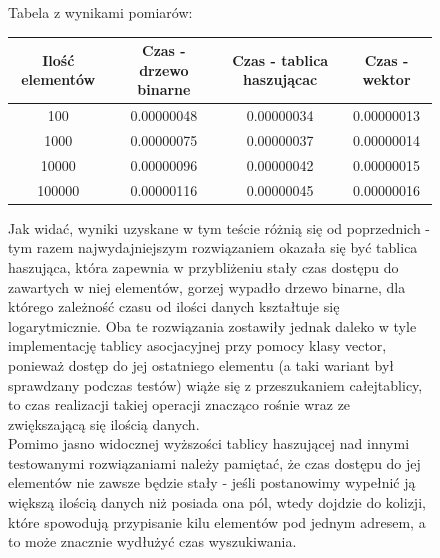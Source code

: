 \documentclass[a4paper,11pt]{report}
\begin{document}
\begin{figure}
 \begin{center}
  Tabela z wynikami pomiarów:\\
  \begin{tabular}{|c|c|c|c|}
  \hline 
  Ilość elementów & Czas - drzewo binarne & Czas - tablica haszującac & Czas - wektor\\
  \hline
  100 & 0.00000048 & 0.00000034 & 0.00000013\\
  \hline
  1000	&	0.00000075 & 0.00000037 & 0.00000014\\
  \hline
  10000	&	0.00000096 & 0.00000042 & 0.00000015 \\
  \hline
  100000 &	0.00000116 & 0.00000045 & 0.00000016\\
  \hline

\end{tabular} 
\end{center}
  Jak widać, wyniki uzyskane w tym teście różnią się od poprzednich - tym razem najwydajniejszym rozwiązaniem okazała się być tablica haszująca, która zapewnia w przybliżeniu stały czas dostępu do zawartych w niej elementów, gorzej wypadło drzewo binarne, dla którego zależność czasu od ilości danych kształtuje się logarytmicznie. Oba te rozwiązania zostawiły jednak daleko w tyle implementację tablicy asocjacyjnej przy pomocy klasy vector, ponieważ dostęp do jej ostatniego elementu (a taki wariant był sprawdzany podczas testów) wiąże się z przeszukaniem całejtablicy, to czas realizacji takiej operacji znacząco rośnie wraz ze zwiększającą się ilością danych. 
\\Pomimo jasno widocznej wyższości tablicy haszującej nad innymi testowanymi rozwiązaniami należy pamiętać, że czas dostępu do jej elementów nie zawsze będzie stały - jeśli postanowimy wypełnić ją większą ilością danych niż posiada ona pól, wtedy dojdzie do kolizji, które spowodują przypisanie kilu elementów pod jednym adresem, a to może znacznie wydłużyć czas wyszukiwania.
\end{figure}
\end{document}
